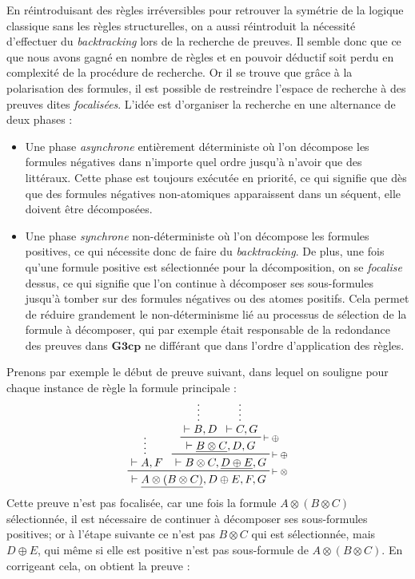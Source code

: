 \documentclass[12pt]{report}
\newcommand{\seq}{\vdash}
\newcommand{\irule}[1]{\footnotesize$#1$}
\newcommand{\iruleR}[1]{\irule{\seq{#1}}}
\begin{document}
En réintroduisant des règles irréversibles pour retrouver la symétrie de la logique classique sans les règles structurelles, on a aussi réintroduit la nécessité d'effectuer du \textit{backtracking} lors de la recherche de preuves. Il semble donc que ce que nous avons gagné en nombre de règles et en pouvoir déductif soit perdu en complexité de la procédure de recherche. Or il se trouve que grâce à la polarisation des formules, il est possible de restreindre l'espace de recherche à des preuves dites \emph{focalisées}. L'idée est d'organiser la recherche en une alternance de deux phases :
\begin{itemize}
	\item Une phase \emph{asynchrone} entièrement déterministe où l'on décompose les formules négatives dans n'importe quel ordre jusqu'à n'avoir que des littéraux. Cette phase est toujours exécutée en priorité, ce qui signifie que dès que des formules négatives non-atomiques apparaissent dans un séquent, elle doivent être décomposées.
	\item Une phase \emph{synchrone} non-déterministe où l'on décompose les formules positives, ce qui nécessite donc de faire du \textit{backtracking}. De plus, une fois qu'une formule positive est sélectionnée pour la décomposition, on se \emph{focalise} dessus, ce qui signifie que l'on continue à décomposer ses sous-formules jusqu'à tomber sur des formules négatives ou des atomes positifs. Cela permet de réduire grandement le non-déterminisme lié au processus de sélection de la formule à décomposer, qui par exemple était responsable de la redondance des preuves dans $\mathbf{G3cp}$ ne différant que dans l'ordre d'application des règles.
\end{itemize}
Prenons par exemple le début de preuve suivant, dans lequel on souligne pour chaque instance de règle la formule principale :
\begin{displaymath}
	\prftree[r]{\iruleR{\otimes}}
		{\prfsummary{\seq A,F}}
		{\prftree[r]{\iruleR{\oplus}}
			{\prftree[r]{\iruleR{\oplus}}
				{\prfsummary{\seq B,D}}
				{\prfsummary{\seq C,G}}
				{\seq \underline{B \otimes C},D,G}}
			{\seq B \otimes C,\underline{D \oplus E},G}}
		{\seq \underline{A \otimes (B \otimes C)},D \oplus E,F,G}
\end{displaymath}
Cette preuve n'est pas focalisée, car une fois la formule $A \otimes (B \otimes C)$ sélectionnée, il est nécessaire de continuer à décomposer ses sous-formules positives; or à l'étape suivante ce n'est pas $B \otimes C$ qui est sélectionnée, mais $D \oplus E$, qui même si elle est positive n'est pas sous-formule de $A \otimes (B \otimes C)$. En corrigeant cela, on obtient la preuve :
\end{document}
